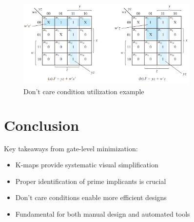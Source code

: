\documentclass[11pt]{article}
\begin{document}
\begin{figure}[htbp]
\centering
\includegraphics[width=0.8\textwidth]{figs/don.png}
\caption{Don't care condition utilization example}
\label{fig:dontcare}
\end{figure}

\section{Conclusion}
Key takeaways from gate-level minimization:
\begin{itemize}
\item K-maps provide systematic visual simplification
\item Proper identification of prime implicants is crucial
\item Don't care conditions enable more efficient designs
\item Fundamental for both manual design and automated tools
\end{itemize}
\end{document}
